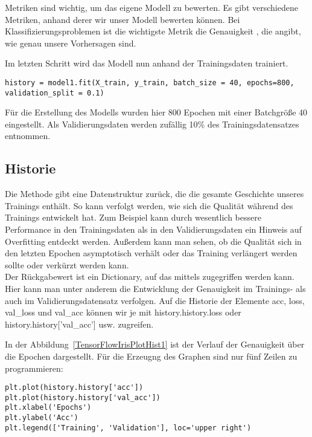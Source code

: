 Metriken sind wichtig, um das eigene Modell zu bewerten. Es gibt verschiedene Metriken, 
anhand derer wir unser Modell bewerten können. Bei Klassifizierungsproblemen ist die 
wichtigste Metrik die Genauigkeit \PYTHON{['acc']}, die angibt, wie genau unsere Vorhersagen sind.

Im letzten Schritt wird das Modell nun anhand der Trainingsdaten trainiert.

\begin{verbatim}
history = model1.fit(X_train, y_train, batch_size = 40, epochs=800, validation_split = 0.1)
\end{verbatim}

Für die Erstellung des Modells wurden hier 800 Epochen mit einer Batchgröße 40 eingestellt. Als Validierungsdaten werden zufällig 
10\% des Trainingsdatensatzes entnommen.

\subsection{Historie}

Die Methode  gibt eine Datenstruktur zurück, die die gesamte Geschichte unseres Trainings enthält. So kann verfolgt werden, 
wie sich die Qualität während des Trainings entwickelt hat. Zum Beispiel kann durch wesentlich bessere Performance in den Trainingsdaten als in den
Validierungsdaten ein Hinweis auf Overfitting entdeckt werden. Außerdem kann man sehen, ob die Qualität sich in den letzten Epochen asymptotisch verhält oder
das Training verlängert werden sollte oder verkürzt werden kann.\\

Der Rückgabewert ist ein Dictionary, auf das mittels  zugegriffen werden kann.
 Hier kann man unter anderem  die Entwicklung der Genauigkeit im Trainings- als auch im Validierungsdatensatz
verfolgen. Auf die Historie der Elemente acc, loss, val\_loss und val\_acc können wir je mit history.history.loss oder history.history['val\_acc'] usw. zugreifen.


In der Abbildung~\ref{TensorFlowIrisPlotHist1}
ist der Verlauf der Genauigkeit über die Epochen dargestellt. Für die Erzeugng des Graphen sind nur fünf Zeilen 
zu programmieren:

\begin{verbatim}
plt.plot(history.history['acc'])
plt.plot(history.history['val_acc'])
plt.xlabel('Epochs')
plt.ylabel('Acc')
plt.legend(['Training', 'Validation'], loc='upper right')
\end{verbatim}

